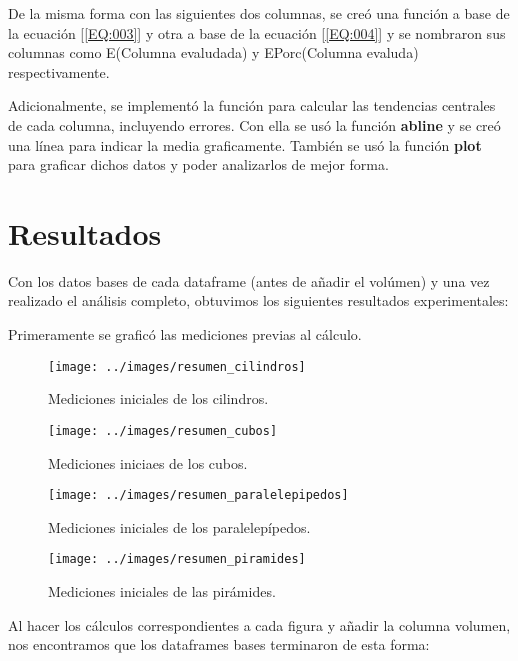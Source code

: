 \documentclass[%
 reprint,
groupedaddress,
unsortedaddress,
 amsmath,amssymb,
 aps,
superscriptaddress
]{revtex4-2}
\begin{document}
De la misma forma con las siguientes dos columnas, se creó una función a base de la ecuación [\ref{EQ:003}] y otra a base de la ecuación [\ref{EQ:004}] y se nombraron sus columnas como E(Columna evaludada) y EPorc(Columna evaluda) respectivamente.

Adicionalmente, se implementó la función  para calcular las tendencias centrales de cada columna, incluyendo errores. Con ella se usó la función \textbf{abline} y se creó una línea para indicar la media graficamente. También se usó la función \textbf{plot} para graficar dichos datos y poder analizarlos de mejor forma.

\section{Resultados}
\label{Sec:res}

Con los datos bases de cada dataframe (antes de añadir el volúmen) y una vez realizado el análisis completo, obtuvimos los siguientes resultados experimentales:


Primeramente se graficó las mediciones previas al cálculo.
\begin{figure}[h]
	\centering
	\texttt{[image: ../images/resumen\_cilindros]}
	\caption{Mediciones iniciales de los cilindros.}
	\label{fig:resumencilindros}
\end{figure}

\begin{figure}[h]
	\centering
	\texttt{[image: ../images/resumen\_cubos]}
	\caption{Mediciones iniciaes de los cubos. }
	\label{fig:resumencubos}
\end{figure}

\begin{figure}[h]
	\centering
	\texttt{[image: ../images/resumen\_paralelepipedos]}
	\caption{Mediciones iniciales de los paralelepípedos.}
	\label{fig:resumenparalelepipedos}
\end{figure}

\begin{figure}[h]
	\centering
	\texttt{[image: ../images/resumen\_piramides]}
	\caption{Mediciones iniciales de las pirámides.}
	\label{fig:resumenpiramides}
\end{figure}

Al hacer los cálculos correspondientes a cada figura y añadir la columna volumen, nos encontramos que los dataframes bases terminaron de esta forma:
\end{document}
